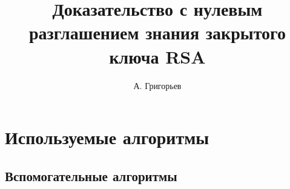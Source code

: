 \documentclass[12pt,a4paper]{report}
\author{А. Григорьев}
\title{Доказательство с нулевым разглашением знания закрытого ключа RSA}
\makeatletter
\def\imod#1{\allowbreak\,({\operator@font mod}\ #1)}
\def \jacobi #1#2{\left(\frac{#1}{#2}\right)}
\makeatother
\begin{document}
\maketitle
\tableofcontents




\chapter{Используемые алгоритмы}

\section{Вспомогательные алгоритмы}

%
%
\end{document}
